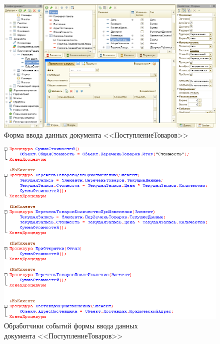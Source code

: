 \pagebreak

\begin{figure}[h!]
  \centering
  \includegraphics[width=150mm]{pic/doc_input_form}
  \caption{Форма ввода данных документа <<ПоступлениеТоваров>>}
  \label{fig:doc_input_form}
\end{figure}

\begin{figure}[h!]
  \centering
  \includegraphics[width=130mm]{pic/doc_input_module}
  \caption{Обработчики событий формы ввода данных \\
    документа <<ПоступлениеТоваров>>}
  \label{fig:doc_input_module}
\end{figure}


